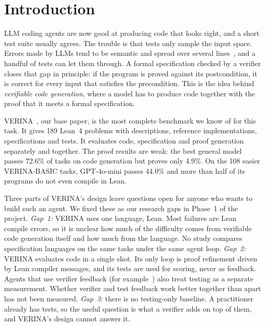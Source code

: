 \section{Introduction}
\label{sec:intro}

LLM coding agents are now good at producing code that looks right, and a short test suite usually agrees. The trouble is that tests only sample the input space. Errors made by LLMs tend to be semantic and spread over several lines~\cite{wang2025errors}, and a handful of tests can let them through. A formal specification checked by a verifier closes that gap in principle: if the program is proved against its postcondition, it is correct for every input that satisfies the precondition. This is the idea behind \emph{verifiable code generation}, where a model has to produce code together with the proof that it meets a formal specification.

VERINA~\cite{ye2026verina}, our base paper, is the most complete benchmark we know of for this task. It gives 189 Lean~4 problems with descriptions, reference implementations, specifications and tests. It evaluates code, specification and proof generation separately and together. The proof results are weak: the best general model passes 72.6\% of tasks on code generation but proves only 4.9\%. On the 108 easier VERINA-BASIC tasks, GPT-4o-mini passes 44.0\% and more than half of its programs do not even compile in Lean.

Three parts of VERINA's design leave questions open for anyone who wants to build such an agent. We fixed these as our research gaps in Phase~1 of the project.
\emph{Gap~1:} VERINA uses one language, Lean. Most failures are Lean compile errors, so it is unclear how much of the difficulty comes from verifiable code generation itself and how much from the language. No study compares specification languages on the same tasks under the same agent loop.
\emph{Gap~2:} VERINA evaluates code in a single shot. Its only loop is proof refinement driven by Lean compiler messages, and its tests are used for scoring, never as feedback. Agents that use verifier feedback (for example~\cite{aggarwal2025alphaverus,yang2025autoverus,loughridge2025dafnybench}) also treat testing as a separate measurement. Whether verifier and test feedback work better together than apart has not been measured.
\emph{Gap~3:} there is no testing-only baseline. A practitioner already has tests, so the useful question is what a verifier adds on top of them, and VERINA's design cannot answer it.

